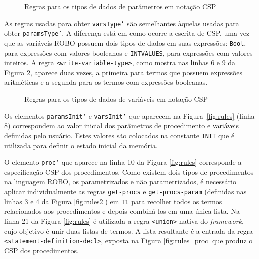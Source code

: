 \begin{figure}[!h]
\centering
\caption{Regras para os tipos de dados de parâmetros em notação CSP}

\label{fig:rules_param_type}
\end{figure}

As regras usadas para obter \texttt{varsType'} são semelhantes àquelas usadas para obter \texttt{paramsType'}. A diferença está em como ocorre a escrita de CSP, uma vez que as variáveis ROBO possuem dois tipos de dados em suas expressões: \texttt{Bool}, para expressões com valores booleanos e \texttt{INTVALUES}, para expressões com valores inteiros. A regra \texttt{<write-variable-type>}, como mostra nas linhas 6 e 9 da Figura \ref{fig:rules_var_type}, aparece duas vezes, a primeira para termos que possuem expressões aritméticas e a segunda para os termos com expressões booleanas.

\begin{figure}[!h]
\centering
\caption{Regras para os tipos de dados de variáveis em notação CSP}

\label{fig:rules_var_type}
\end{figure}


Os elementos \texttt{paramsInit'} e \texttt{varsInit'} que aparecem na Figura~\ref{fig:rules} (linha 8) correspondem ao valor inicial dos parâmetros de procedimento e variáveis definidas pelo usuário. Estes valores são colocados na constante \texttt{INIT} que é utilizada para definir o estado inicial da memória. 

O elemento \texttt{proc'} que aparece na linha 10 da Figura \ref{fig:rules} corresponde a especificação CSP dos procedimentos.  
Como existem dois tipos de procedimentos na linguagem ROBO, os parametrizados e não parametrizados, é necessário aplicar individualmente as regras \texttt{get-procs} e \texttt{get-procs-param} (definidas nas linhas 3 e 4 da Figura \ref{fig:rules2}) em \texttt{T1} para recolher todos os termos relacionados aos procedimentos e depois combiná-los em uma única lista.
Na linha 21 da Figura \ref{fig:rules} é utilizada a regra \texttt{<union>}  nativa do \textit{framework}, cujo objetivo é unir duas listas de termos.  A lista resultante é a entrada da regra \texttt{<statement-definition-decl>}, exposta na Figura \ref{fig:rules_proc} que produz o CSP dos procedimentos.

